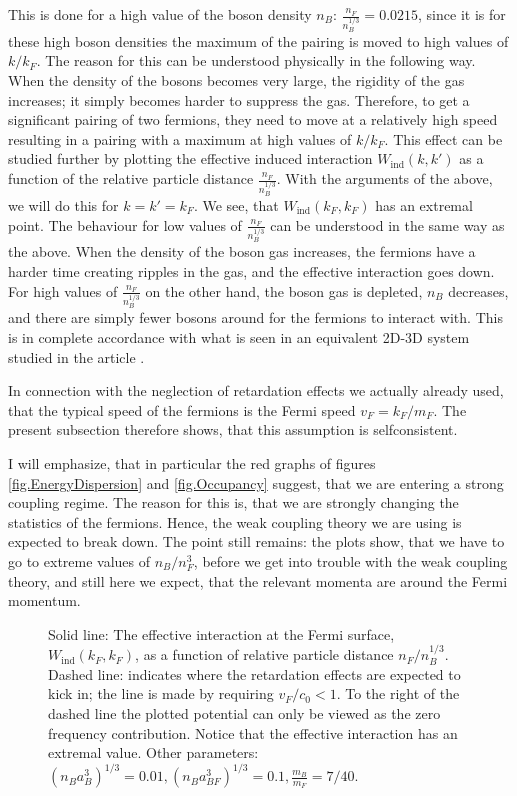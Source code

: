 This is done for a high value of the boson density $n_B$: $\frac{n_F}{n_B^{1/3}} = 0.0215$, since it is for these high boson densities the maximum of the pairing is moved to high values of $k/k_F$. The reason for this can be understood physically in the following way. When the density of the bosons becomes very large, the rigidity of the gas increases; it simply becomes harder to suppress the gas. Therefore, to get a significant pairing of two fermions, they need to move at a relatively high speed resulting in a pairing with a maximum at high values of $k/k_F$. This effect can be studied further by plotting the effective induced interaction $W_{\text{ind}}(k,k')$ as a function of the relative particle distance $\frac{n_F}{n_B^{1/3}}$. With the arguments of the above, we will do this for $k = k' = k_F$. We see, that $W_{\text{ind}}(k_F,k_F)$ has an extremal point. The behaviour for low values of $\frac{n_F}{n_B^{1/3}}$ can be understood in the same way as the above. When the density of the boson gas increases, the fermions have a harder time creating ripples in the gas, and the effective interaction goes down. For high values of $\frac{n_F}{n_B^{1/3}}$ on the other hand, the boson gas is depleted, $n_B$ decreases, and there are simply fewer bosons around for the fermions to interact with. This is in complete accordance with what is seen in an equivalent 2D-3D system studied in the article \cite{BruunZhigangTopSuperfluid}. 

In connection with the neglection of retardation effects we actually already used, that the typical speed of the fermions is the Fermi speed $v_F = k_F/m_F$. The present subsection therefore shows, that this assumption is selfconsistent. 

I will emphasize, that in particular the red graphs of figures \ref{fig.EnergyDispersion} and \ref{fig.Occupancy} suggest, that we are entering a strong coupling regime. The reason for this is, that we are strongly changing the statistics of the fermions. Hence, the weak coupling theory we are using is expected to break down. The point still remains: the plots show, that we have to go to extreme values of $n_B/n_F^3$, before we get into trouble with the weak coupling theory, and still here we expect, that the relevant momenta are around the Fermi momentum. 

\begin{figure} 
\begin{center}  
  
\caption{Solid line: The effective interaction at the Fermi surface, $W_{\text{ind}}(k_F,k_F)$, as a function of relative particle distance $n_F/n_B^{1/3}$. Dashed line: indicates where the retardation effects are expected to kick in; the line is made by requiring $v_F/c_0 < 1$. To the right of the dashed line the plotted potential can only be viewed as the zero frequency contribution. Notice that the effective interaction has an extremal value. Other parameters: $(n_Ba_B^3)^{1/3} = 0.01, (n_Ba_{BF}^3)^{1/3} = 0.1, \frac{m_B}{m_F} = 7/40.$}  
\label{fig.EffectiveInteraction.nBdepend}  
\end{center}    
\end{figure}

